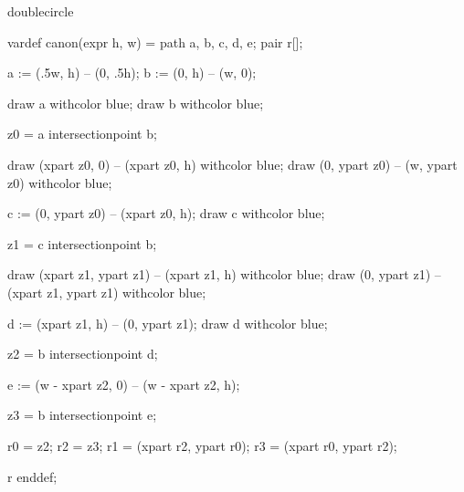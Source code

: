 
%

\startenvironment doublecircle

	\startMPdefinitions
		vardef canon(expr h, w) =
			path a, b, c, d, e;
			pair r[];

			a := (.5w, h) -- (0, .5h);
			b := (0, h) -- (w, 0);

			draw a withcolor blue;
			draw b withcolor blue;

			z0 = a intersectionpoint b; %

			draw (xpart z0, 0) -- (xpart z0, h) withcolor blue;
			draw (0, ypart z0) -- (w, ypart z0) withcolor blue;

			c := (0, ypart z0) -- (xpart z0, h);
			draw c withcolor blue;

			z1 = c intersectionpoint b;

			draw (xpart z1, ypart z1) -- (xpart z1, h) withcolor blue;
			draw (0, ypart z1) -- (xpart z1, ypart z1) withcolor blue;

			d := (xpart z1, h) -- (0, ypart z1);
			draw d withcolor blue;

			z2 = b intersectionpoint d; %

			e := (w - xpart z2, 0) -- (w - xpart z2, h); %

			z3 = b intersectionpoint e; %

			r0 = z2; %
			r2 = z3; %
			r1 = (xpart r2, ypart r0); %
			r3 = (xpart r0, ypart r2); %

			r
		enddef;
	\stopMPdefinitions

\stopenvironment

